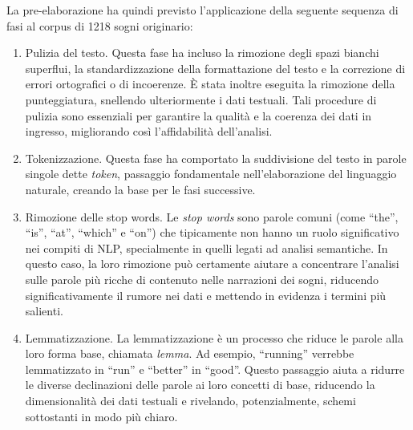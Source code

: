 La pre-elaborazione ha quindi previsto l'applicazione della seguente sequenza di fasi al corpus di 1218 sogni
originario:
\begin{enumerate}
    \item Pulizia del testo. \newline \noindent
          Questa fase ha incluso la rimozione degli spazi bianchi superflui, la standardizzazione della
          formattazione del testo e la correzione di errori ortografici o di incoerenze. È stata inoltre eseguita la
          rimozione della punteggiatura, snellendo ulteriormente i dati testuali. Tali procedure di pulizia sono
          essenziali per garantire la qualità e la coerenza dei dati in ingresso, migliorando così l'affidabilità
          dell'analisi.
    \item Tokenizzazione. \newline \noindent
          Questa fase ha comportato la suddivisione del testo in parole singole dette \textit{token},
          passaggio fondamentale nell'elaborazione del linguaggio naturale, creando la base per le fasi successive.
    \item Rimozione delle stop words. \newline \noindent
          Le \textit{stop words} sono parole comuni (come ``the'', ``is'', ``at'', ``which'' e ``on'') che tipicamente non hanno
          un ruolo significativo nei compiti di NLP, specialmente in quelli legati ad analisi semantiche.
          In questo caso, la loro rimozione può certamente aiutare a concentrare l'analisi sulle parole più ricche di
          contenuto nelle narrazioni dei sogni, riducendo significativamente il rumore nei dati e mettendo in evidenza
          i termini più salienti.
    \item Lemmatizzazione. \newline \noindent
          La lemmatizzazione è un processo che riduce le parole alla loro forma base, chiamata \textit{lemma}.
          Ad esempio, ``running'' verrebbe lemmatizzato in ``run'' e ``better'' in ``good''.
          Questo passaggio aiuta a ridurre le diverse declinazioni delle parole ai loro concetti di base, riducendo
          la dimensionalità dei dati testuali e rivelando, potenzialmente, schemi sottostanti in modo più chiaro.

\end{enumerate}
